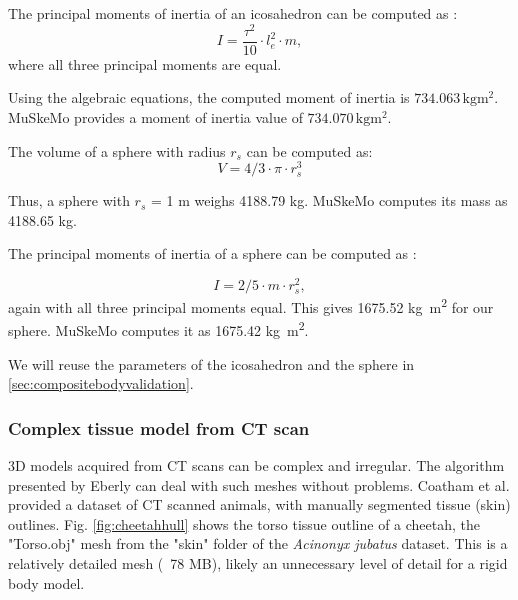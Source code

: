 \documentclass{article}
\begin{document}
The principal moments of inertia of an icosahedron can be computed as \cite{satterlyMomentsInertiaPolyhedra1958}:
\begin{equation}
I = \frac{\tau^2}{10} \cdot l_{e}^2 \cdot m,
\end{equation}
where all three principal moments are equal.

Using the algebraic equations, the computed moment of inertia is \(734.063 \, \si{\kilogram \metre^2}\). MuSkeMo provides a moment of inertia value of \(734.070 \, \si{\kilogram \metre^2}\).

The volume of a sphere with radius \(r_{s}\) can be computed as:
\begin{equation}
V = 4/3 \cdot \pi \cdot  r_{s}^3
\end{equation}


Thus, a sphere with \(r_{s}\) = 1 \si{m} weighs 4188.79 \si{kg}. MuSkeMo computes its mass as 4188.65 \si{kg}.

The principal moments of inertia of a sphere can be computed as \cite{ruinaMechanicsToolsetStatics2019}:

\begin{equation}
I = 2/5 \cdot m \cdot  r_{s}^2,
\end{equation}
again with all three principal moments equal. This gives 1675.52 \si{\kilogram \metre^2} for our sphere. MuSkeMo computes it as 1675.42 \si{\kilogram \metre^2}.

We will reuse the parameters of the icosahedron and the sphere in \ref{sec:compositebodyvalidation}.

\subsubsection*{Complex tissue model from CT scan}

3D models acquired from CT scans can be complex and irregular. The algorithm presented by Eberly \cite{eberlyGamePhysics2004} can deal with such meshes without problems. Coatham et al. \cite{coathamConvexHullEstimation2021} provided a dataset of CT scanned animals, with manually segmented tissue (skin) outlines. Fig. \ref{fig:cheetahhull} shows the torso tissue outline of a cheetah, the "Torso.obj" mesh from the "skin" folder of the \textit{Acinonyx jubatus} dataset. This is a relatively detailed mesh (~78 MB), likely an unnecessary level of detail for a rigid body model.
\end{document}
